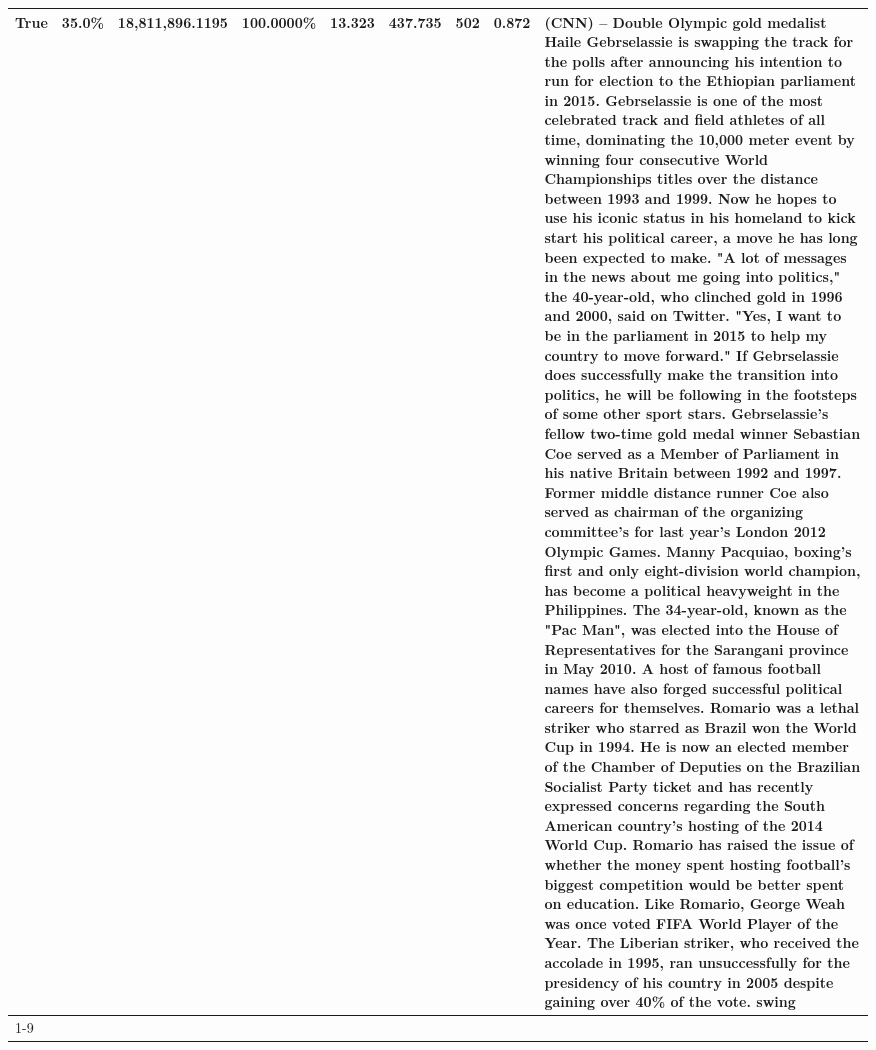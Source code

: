 \begin{table}[H]
{\begin{tabular}{lllrlllll}
True & 35.0\% & 18,811,896.1195 & \bfseries \color{red} 100.0000\% & 13.323 & 437.735 & 502 & 0.872 & (CNN) -- Double Olympic gold medalist Haile Gebrselassie is swapping the track for the polls after announcing his intention to run for election to the Ethiopian parliament in 2015. Gebrselassie is one of the most celebrated track and field athletes of all time, dominating the 10,000 meter event by winning four consecutive World Championships titles over the distance between 1993 and 1999. Now he hopes to use his iconic status in his homeland to kick start his political career, a move he has long been expected to make. "A lot of messages in the news about me going into politics," the 40-year-old, who clinched gold in 1996 and 2000, said on Twitter. "Yes, I want to be in the parliament in 2015 to help my country to move forward." If Gebrselassie does successfully make the transition into politics, he will be following in the footsteps of some other sport stars. Gebrselassie's fellow two-time gold medal winner Sebastian Coe served as a Member of Parliament in his native Britain between 1992 and 1997. Former middle distance runner Coe also served as chairman of the organizing committee's for last year's London 2012 Olympic Games. Manny Pacquiao, boxing's first and only eight-division world champion, has become a political heavyweight in the Philippines. The 34-year-old, known as the "Pac Man", was elected into the House of Representatives for the Sarangani province in May 2010. A host of famous football names have also forged successful political careers for themselves. Romario was a lethal striker who starred as Brazil won the World Cup in 1994. He is now an elected member of the Chamber of Deputies on the Brazilian Socialist Party ticket and has recently expressed concerns regarding the South American country's hosting of the 2014 World Cup. Romario has raised the issue of whether the money spent hosting football's biggest competition would be better spent on education. Like Romario, George Weah was once voted FIFA World Player of the Year. The Liberian striker, who received the accolade in 1995, ran unsuccessfully for the presidency of his country in 2005 despite gaining over 40\% of the vote. swing \\
\cline{1-9}

\end{tabular}}
\end{table}
